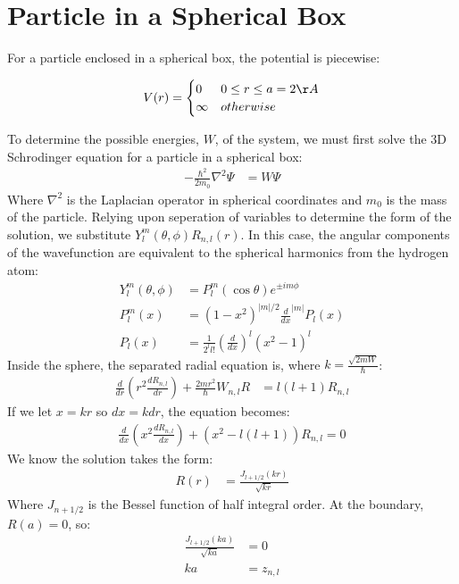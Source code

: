 \documentclass{article}
\numberwithin{equation}{section}
\begin{document}
\large
\section*{Particle in a Spherical Box}
For a particle enclosed in a spherical box, the potential is piecewise:
\begin{center}
$$
V(r) =
\begin{cases}
0 & 0 \leq r\leq a=2 \AA \\
\infty & otherwise\\
\end{cases}
$$
\end{center}
To determine the possible energies, $W$, of the system, we must first solve the 3D Schrodinger equation for a particle in a spherical box:
\begin{align*}
	-\frac{\hbar^2}{2m_0}\nabla^2\Psi &= W\Psi
\end{align*}
Where $\nabla^2$ is the Laplacian operator in spherical coordinates and $m_0$ is the mass of the particle. Relying upon seperation of variables to determine the form of the solution, we substitute $Y^m_l(\theta,\phi)R_{n,l}(r)$. In this case, the angular components of the wavefunction are equivalent to the spherical harmonics from the hydrogen atom:
\begin{align*}
	Y^m_l(\theta,\phi) &= P^m_l(\cos\theta)e^{\pm im\phi}\\
	P^m_l(x) &=(1-x^2)^{|m|/2}\frac{d}{dx}^{|m|}P_l(x)\\
        P_l(x)&=\frac{1}{2^ll!}(\frac{d}{dx})^l(x^2-1)^l
\end{align*}
Inside the sphere, the separated radial equation is, where $k=\frac{\sqrt{2mW}}{\hbar}$:
\begin{align*}
	\frac{d}{dr}(r^2\frac{dR_{n,l}}{dr})+\frac{2mr^2}{\hbar}W_{n,l}R&=l(l+1)R_{n,l}
\end{align*}
If we let $x=kr$ so $dx=kdr$, the equation becomes:
\begin{align*}
        \frac{d}{dx}(x^2\frac{dR_{n,l}}{dx})+(x^2-l(l+1))R_{n,l}=0
\end{align*}
We know the solution takes the form:
\begin{align*}
	R(r)&=\frac{J_{l+1/2}(kr)}{\sqrt{kr}}
\end{align*}
Where $J_{n+1/2}$ is the Bessel function of half integral order. At the boundary, $R(a)=0$, so:
\begin{align*}
	\frac{J_{l+1/2}(ka)}{\sqrt{ka}}&=0\\
	ka&=z_{n,l}
\end{align*}
\end{document}
